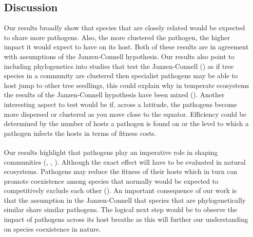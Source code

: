 \documentclass{article}
\begin{document}
\subsection{Discussion}
Our results broadly show that species that are closely related would be expected to share more pathogens. Also, the more clustered the pathogen, the higher impact it would expect to have on its host. Both of these results are in agreement with assumptions of the Janzen-Connell hypothesis. Our results also point to including phylogenetics into studies that test the Janzen-Connell (\citep{Liu2012}) as if tree species in a community are clustered then specialist pathogens may be able to host jump to other tree seedlings, this could explain why in temperate ecosystems the results of the Janzen-Connell hypothesis have been mixed (\citep{Hyatt2003}). Another interesting aspect to test would be if, across a latitude, the pathogens become more dispersed or clustered as you move close to the equator. Efficiency could be determined by the number of hosts a pathogen is found on or the level to which a pathogen infects the hosts in terms of fitness costs. 

\paragraph{}Our results highlight that pathogens play an imperative role in shaping communities (\citep{Janzen1970}, \citep{Connell1978}, \citep{Bush1997}). Although the exact effect will have to be evaluated in natural ecosystems. Pathogens may reduce the fitness of their hosts which in turn can promote coexistence among species that normally would be expected to competitively exclude each other (\citep{Spear2018}). An important consequence of our work is that the assumption in the Janzen-Connell that species that are phylogenetically similar share similar pathogens. The logical next step would be to observe the impact of pathogens across its host breathe as this will further our understanding on species coexistence in nature. 



\end{document}
